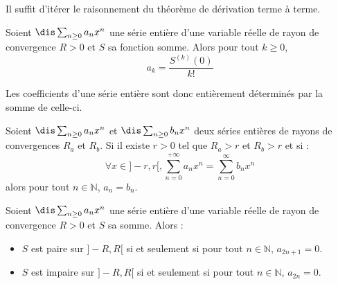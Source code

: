 \documentclass[a4paper,10pt]{report}
\begin{document}
\begin{preuve} Il suffit d'itérer le raisonnement du théorème de dérivation terme à terme.
\end{preuve}

\begin{cor} Soient $\dis \sum_{n \geq 0} a_n x^n$ une série entière d'une variable réelle de rayon de convergence $R>0$ et $S$ sa fonction somme. Alors pour tout $k \geq 0$,
$$ a_k = \frac{S^{(k)}(0)}{k!}$$
\end{cor}

\begin{preuve}

\vspace{4cm}
\end{preuve}

\begin{rem} Les coefficients d'une série entière sont donc entièrement déterminés par la somme de celle-ci.
\end{rem}

\begin{thm}
Soient $\dis \sum_{n \geq 0} a_n x^n$ et $\dis \sum_{n \geq 0} b_n x^n$ deux séries entières de rayons de convergences $R_a$ et $R_b$. Si il existe $r>0$ tel que $R_a>r$ et $R_b >r$ et si :
$$ \forall x \in ]-r,r[, \sum_{n=0}^{+ \infty} a_n x^n = \sum_{n=0}^{\infty} b_n x^n$$
alors pour tout $n \in \mathbb{N}$, $a_n=b_n$.
\end{thm}

\begin{preuve}
\vspace{4cm}
\end{preuve}

\begin{cor} Soient $\dis \sum_{n \geq 0} a_n x^n$ une série entière d'une variable réelle de rayon de convergence $R>0$ et $S$ sa somme. Alors :
\begin{itemize}
\item $S$ est paire sur $]-R,R[$ si et seulement si pour tout $n \in \mathbb{N}$, $a_{2n+1}=0$.
\item $S$ est impaire sur $]-R,R[$ si et seulement si pour tout $n \in \mathbb{N}$, $a_{2n}=0$.
\end{itemize}
\end{cor}

\begin{preuve}

\vspace{3cm}
\end{preuve}
\end{document}
